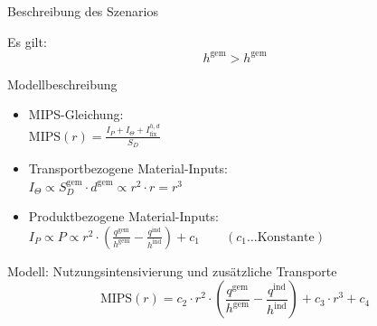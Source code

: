 \documentclass[beamer, xcolor={table,usenames,dvipsnames}]{beamer}
\begin{document}
\begin{frame}{Beschreibung des Szenarios}
\begin{minipage}[t]{0.43\textwidth}
{                Es gilt:
                $$h^\text{gem} > h^\text{gem} $$
            }
        \end{minipage}
    \end{frame}


    \begin{frame}{Modellbeschreibung}
        \begin{itemize}
            \pause
            \item MIPS-Gleichung:\\
                $\text{MIPS}(r) = \frac{I_P + I_\Theta + I_\text{fix}^{h,d}}{S_D}$
			\pause
            \item Transportbezogene Material-Inputs:\\
                $I_\Theta \propto S_D^\text{gem} \cdot d^\text{gem} \propto r^2 \cdot r
                = r^3$
			\pause
            \item Produktbezogene Material-Inputs:\\
                $ I_P \propto P \propto r^2 \cdot \left(
                \frac{q^\text{gem}}{h^\text{gem}} - \frac{q^\text{ind}}{h^\text{ind}}
                \right) + c_1 \qquad (c_1 \dots \text{Konstante})$
        \end{itemize}
        \pause
        \begin{block}{Modell: Nutzungsintensivierung und zusätzliche Transporte}
             $$\text{MIPS}(r) = c_2 \cdot r^2 \cdot \left( \frac{q^\text{gem}}{h^\text{gem}} - \frac{q^\text{ind}}{h^\text{ind}} \right) + c_3 \cdot r^3 + c_4$$
        \end{block}
    \end{frame}
\end{document}
